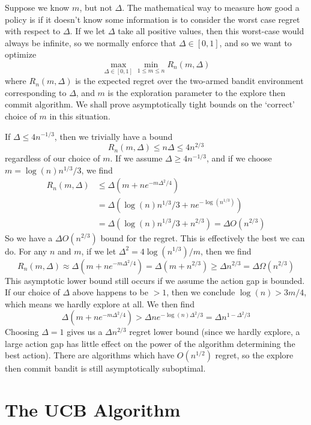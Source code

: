 Suppose we know $m$, but not $\Delta$. The mathematical way to measure how good a policy is if it doesn't know some information is to consider the worst case regret with respect to $\Delta$. If we let $\Delta$ take all positive values, then this worst-case would always be infinite, so we normally enforce that $\Delta \in [0,1]$, and so we want to optimize
%
\[ \max_{\Delta \in [0,1]} \min_{1 \leq m \leq n} R_n(m, \Delta) \]
%
where $R_n(m, \Delta)$ is the expected regret over the two-armed bandit environment corresponding to $\Delta$, and $m$ is the exploration parameter to the explore then commit algorithm. We shall prove asymptotically tight bounds on the `correct' choice of $m$ in this situation.

If $\Delta \leq 4n^{-1/3}$, then we trivially have a bound
%
\[ R_n(m, \Delta) \leq n \Delta \leq 4n^{2/3} \]
%
regardless of our choice of $m$. If we assume $\Delta \geq 4n^{-1/3}$, and if we choose $m = \log(n) n^{1/3}/3$, we find
%
\begin{align*}
    R_n(m, \Delta) &\leq \Delta(m + n e^{-m \Delta^2/4})\\
    &= \Delta (\log(n) n^{1/3}/3 + n e^{- \log(n^{1/3})})\\
    &= \Delta(\log(n) n^{1/3}/3 + n^{2/3}) = \Delta O(n^{2/3})
\end{align*}
%
So we have a $\Delta O(n^{2/3})$ bound for the regret. This is effectively the best we can do. For any $n$ and $m$, if we let $\Delta^2 = 4 \log(n^{1/3})/m$, then we find
%
\[ R_n(m, \Delta) \approx \Delta (m + n e^{-m \Delta^2/4}) = \Delta(m + n^{2/3}) \geq \Delta n^{2/3} = \Delta \Omega(n^{2/3}) \]
%
This asymptotic lower bound still occurs if we assume the action gap is bounded. If our choice of $\Delta$ above happens to be $> 1$, then we conclude $\log(n) > 3m/4$, which means we hardly explore at all. We then find
%
\[ \Delta (m + n e^{-m \Delta^2/4}) > \Delta n e^{-\log(n) \Delta^2/3} = \Delta n^{1 - \Delta^2/3} \]
%
Choosing $\Delta = 1$ gives us a $\Delta n^{2/3}$ regret lower bound (since we hardly explore, a large action gap has little effect on the power of the algorithm determining the best action). There are algorithms which have $O(n^{1/2})$ regret, so the explore then commit bandit is still asymptotically suboptimal.

\section{The UCB Algorithm}

